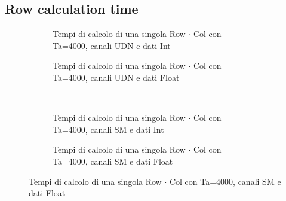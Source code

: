 \FloatBarrier
\subsection{Row calculation time}

\begin{figure}[h]
  \caption{Rapporto tra i tempi di calcolo di un singolo prodotto scalare}
  \begin{subfigure}[b]{.5\textwidth}
    \centering
    \resizebox{\columnwidth}{!}{}
    \caption{Tempi di calcolo di una singola Row $\cdot$ Col con Ta=4000, canali UDN e dati Int}
  \end{subfigure}
  \hspace{2ex}
  \begin{subfigure}[b]{.5\textwidth}
    \centering
    \resizebox{\columnwidth}{!}{}
    \caption{Tempi di calcolo di una singola Row $\cdot$ Col con Ta=4000, canali UDN e dati Float}
  \end{subfigure}
  ~
  \begin{subfigure}[b]{.5\textwidth}
    \centering
    \resizebox{\columnwidth}{!}{}
    \caption{Tempi di calcolo di una singola Row $\cdot$ Col con Ta=4000, canali SM e dati Int}
  \end{subfigure}
  \hspace{2ex}
  \begin{subfigure}[b]{.5\textwidth}
    \centering
    \resizebox{\columnwidth}{!}{}
    \caption{Tempi di calcolo di una singola Row $\cdot$ Col con Ta=4000, canali SM e dati Float}
  \end{subfigure}
\end{figure}

\FloatBarrier

